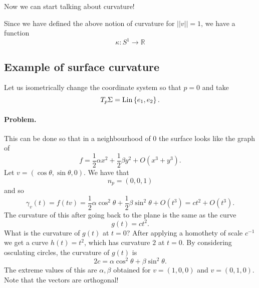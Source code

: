 
Now we can start talking about curvature!
Since we have defined the above notion of curvature for \( \left \lvert\lvert v \right\rvert\rvert = 1 \), we have a function
\[ 
    \kappa: S^1 \to \mathbb{R} 
\]

\subsection{Example of surface curvature}

Let us isometrically change the coordinate system so that \( p = 0 \) and take
\[ 
    T_p\Sigma = \operatorname{Lin} \left \{ e_1, e_2 \right \}.
\]

\paragraph{Problem.} This can be done so that in a neighbourhood of \( 0 \) the surface looks like the graph of
\[ 
    f = \frac{1}{2} \alpha x^2 + \frac{1}{2} \beta y^2 + O( x^3 + y^3 ).
\]
Let \( v = (\cos \theta, \sin \theta, 0) \). We have that
\[ 
    n_p = (0,0,1) 
\]
and so
\[ 
    \gamma_v(t) = f(tv) = \frac{1}{2}\alpha \cos^2\theta + \frac{1}{2}\beta \sin^2\theta + O(t^3) = ct^2 + O(t^3).
\]
The curvature of this after going back to the plane is the same as the curve
\[ 
    g(t) = ct^2. 
\]
What is the curvature of \( g(t) \) at \( t = 0 \)? After applying a homothety of scale \( c^{-1} \) we get a curve \( h(t) = t^2 \), which has curvature \( 2 \) at \( t = 0 \). By considering osculating circles, the curvature of \( g(t) \) is
\[ 
    2c = \alpha\cos^2\theta  + \beta\sin^2\theta.
\]
The extreme values of this are \( \alpha, \beta \) obtained for \( v = (1,0,0) \) and \( v = (0,1,0) \). Note that the vectors are orthogonal!

